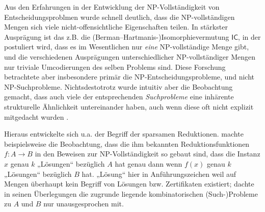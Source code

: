 

Aus den Erfahrungen in der Entwicklung der NP-Vollständigkeit von Entscheidungsproblmen wurde schnell deutlich, dass die NP-vollständigen Mengen sich viele nicht-offensichtliche Eigenschaften teilen. 
In stärkster Ausprägung ist das z.B. die (Berman–Hartmanis-\nolinebreak)\linebreak[1]Isomorphievermutung $\mathsf{IC}$, in der postuliert wird, dass es im Wesentlichen nur \emph{eine} NP-vollständige Menge gibt, und die verschiedenen Ausprägungen unterschiedlicher NP-vollständiger Mengen nur triviale Umcodierungen des selben Problems sind.
Diese Forschung betrachtete aber insbesondere primär die NP-Entscheidungsprobleme, und nicht NP-Suchprobleme.
Nichtsdestotrotz wurde intuitiv aber die Beobachtung gemacht, dass auch viele der entsprechenden \emph{Suchprobleme} eine inhärente strukturelle Ähnlichkeit untereinander haben, auch wenn diese oft nicht explizit mitgedacht wurden \parencite[vgl. auch die Diskussion von][]{hemaspaandra_take-home_1998}.

Hieraus entwickelte sich u.a. der Begriff der sparsamen Reduktionen.
\textcite[83]{simon_central_1975} machte beispielsweise die Beobachtung, dass die ihm bekannten Reduktionsfunktionen $f\colon A\to B$ in den Beweisen zur NP-Vollständigkeit so gebaut sind, dass die Instanz $x$ genau $k$ „Lösungen“ bezüglich $A$ hat genau dann wenn $f(x)$ genau $k$ „Lösungen“ bezüglich $B$ hat. „Lösung“ hier in Anführungszeichen weil auf Mengen überhaupt kein Begriff von Lösungen bzw. Zertifikaten existiert; \citeauthor{simon_central_1975} dachte in seinen Überlegungen die zugrunde liegende kombinatorischen (Such-)Probleme zu $A$ und $B$ nur unausgesprochen mit.

